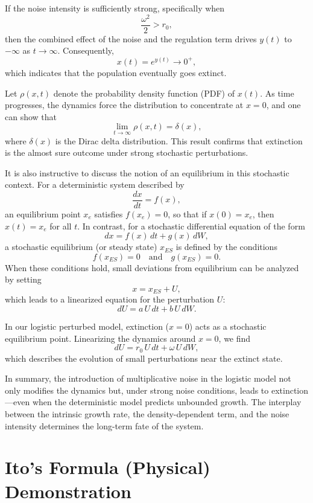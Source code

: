 If the noise intensity is sufficiently strong, specifically when
$$
\frac{\omega^2}{2} > r_0,
$$
then the combined effect of the noise and the regulation term drives $y(t)$ to $-\infty$ as $t\to\infty$. Consequently,
$$
x(t)=e^{y(t)} \to 0^+,
$$
which indicates that the population eventually goes extinct.

Let $\rho(x,t)$ denote the probability density function (PDF) of $x(t)$. As time progresses, the dynamics force the distribution to concentrate at $x=0$, and one can show that
$$
\lim_{t\to\infty} \rho(x,t) = \delta(x),
$$
where $\delta(x)$ is the Dirac delta distribution. This result confirms that extinction is the almost sure outcome under strong stochastic perturbations.

It is also instructive to discuss the notion of an equilibrium in this stochastic context. For a deterministic system described by
$$
\frac{dx}{dt} = f(x),
$$
an equilibrium point $x_e$ satisfies $f(x_e)=0$, so that if $x(0)=x_e$, then $x(t)=x_e$ for all $t$. In contrast, for a stochastic differential equation of the form
$$
dx = f(x)\,dt + g(x)\,dW,
$$
a stochastic equilibrium (or steady state) $x_{ES}$ is defined by the conditions
$$
f(x_{ES})=0 \quad \text{and} \quad g(x_{ES})=0.
$$
When these conditions hold, small deviations from equilibrium can be analyzed by setting
$$
x = x_{ES} + U,
$$
which leads to a linearized equation for the perturbation $U$:
$$
dU = a\,U\,dt + b\,U\,dW.
$$

In our logistic perturbed model, extinction ($x=0$) acts as a stochastic equilibrium point. Linearizing the dynamics around $x=0$, we find
$$
dU = r_0\,U\,dt + \omega\,U\,dW,
$$
which describes the evolution of small perturbations near the extinct state.

\vspace{1em}

In summary, the introduction of multiplicative noise in the logistic model not only modifies the dynamics but, under strong noise conditions, leads to extinction—even when the deterministic model predicts unbounded growth. The interplay between the intrinsic growth rate, the density-dependent term, and the noise intensity determines the long-term fate of the system.

\newpage

\section{Ito's Formula (Physical) Demonstration}

